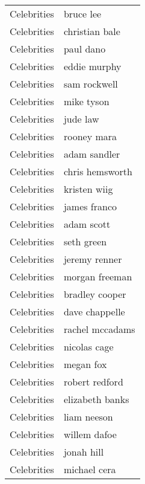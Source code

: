 \begin{supertabular}{l p{0.25\textwidth}}
      Celebrities &                          bruce lee \\
      Celebrities &                     christian bale \\
      Celebrities &                          paul dano \\
      Celebrities &                       eddie murphy \\
      Celebrities &                       sam rockwell \\
      Celebrities &                         mike tyson \\
      Celebrities &                           jude law \\
      Celebrities &                        rooney mara \\
      Celebrities &                       adam sandler \\
      Celebrities &                    chris hemsworth \\
      Celebrities &                       kristen wiig \\
      Celebrities &                       james franco \\
      Celebrities &                         adam scott \\
      Celebrities &                         seth green \\
      Celebrities &                      jeremy renner \\
      Celebrities &                     morgan freeman \\
      Celebrities &                     bradley cooper \\
      Celebrities &                     dave chappelle \\
      Celebrities &                    rachel mccadams \\
      Celebrities &                       nicolas cage \\
      Celebrities &                          megan fox \\
      Celebrities &                     robert redford \\
      Celebrities &                    elizabeth banks \\
      Celebrities &                        liam neeson \\
      Celebrities &                       willem dafoe \\
      Celebrities &                         jonah hill \\
      Celebrities &                       michael cera \\

\end{supertabular}
